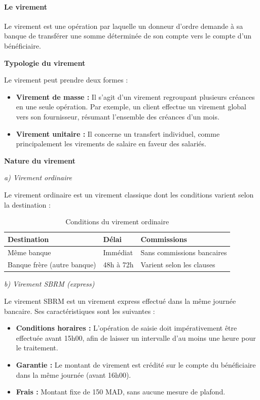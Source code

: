 \documentclass[12pt,a4paper]{report}
\begin{document}
\paragraph{Le virement}

Le virement est une opération par laquelle un donneur d'ordre demande à sa banque de transférer une somme déterminée de son compte vers le compte d'un bénéficiaire.

\medskip\textbf{Typologie du virement}

Le virement peut prendre deux formes :
\begin{itemize}
  \item \textbf{Virement de masse :} Il s'agit d'un virement regroupant plusieurs créances en une seule opération. Par exemple, un client effectue un virement global vers son fournisseur, résumant l'ensemble des créances d'un mois.
  \item \textbf{Virement unitaire :} Il concerne un transfert individuel, comme principalement les virements de salaire en faveur des salariés.
\end{itemize}

\medskip\textbf{Nature du virement}

\medskip\textit{a) Virement ordinaire}

Le virement ordinaire est un virement classique dont les conditions varient selon la destination :

\begin{table}[h!]
\centering
\begin{tabularx}{\textwidth}{X X X}
\toprule
Destination & Délai & Commissions \\
\midrule
Même banque & Immédiat & Sans commissions bancaires \\
Banque frère (autre banque) & 48h à 72h & Varient selon les clauses \\
\bottomrule
\end{tabularx}
\caption{Conditions du virement ordinaire}
\end{table}

\medskip\textit{b) Virement SBRM (express)}

Le virement SBRM est un virement express effectué dans la même journée bancaire. Ses caractéristiques sont les suivantes :
\begin{itemize}
  \item \textbf{Conditions horaires :} L'opération de saisie doit impérativement être effectuée avant 15h00, afin de laisser un intervalle d'au moins une heure pour le traitement.
  \item \textbf{Garantie :} Le montant de virement est crédité sur le compte du bénéficiaire dans la même journée (avant 16h00).
  \item \textbf{Frais :} Montant fixe de 150 MAD, sans aucune mesure de plafond.
\end{itemize}
\end{document}
